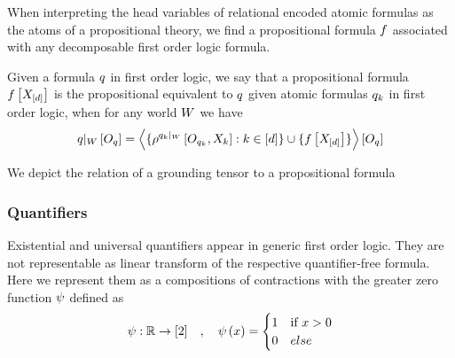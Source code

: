 
When interpreting the head variables of relational encoded atomic formulas as the atoms of a propositional theory, we find a propositional formula $f$ associated with any decomposable first order logic formula.

\begin{definition}\label{def:propositionalEquivalent}
	Given a formula $q$ in first order logic, we say that a propositional formula $f\left[X_{[d]}\right]$ is the propositional equivalent to $q$ given atomic formulas $q_{k}$ in first order logic, when for any world $W$ we have
	\begin{align}
		{q}|_{W} \left[O_{q}\right]
		= \left\langle  
		\{\rho^{{q_{k}}|_{W}}\left[O_{q_{k}}, X_{k}\right] : k\in[d]\} 
		\cup \{f\left[X_{[d]}\right] \}
		\right\rangle \left[ O_{q} \right]
	\end{align}
\end{definition}



We depict the relation of a grounding tensor to a propositional formula 
\begin{center}
	
\end{center}




\subsubsection{Quantifiers}


Existential and universal quantifiers appear in generic first order logic.
They are not representable as linear transform of the respective quantifier-free formula.
Here we represent them as a compositions of contractions with the greater zero function $\psi$ defined as
\begin{align}
	\psi : \mathbb{R} \rightarrow [2] \quad, \quad \psi\left(x\right) = 
	\begin{cases}
		1 &  \text{if  } x > 0\\
		0 & else
	\end{cases}
\end{align}


